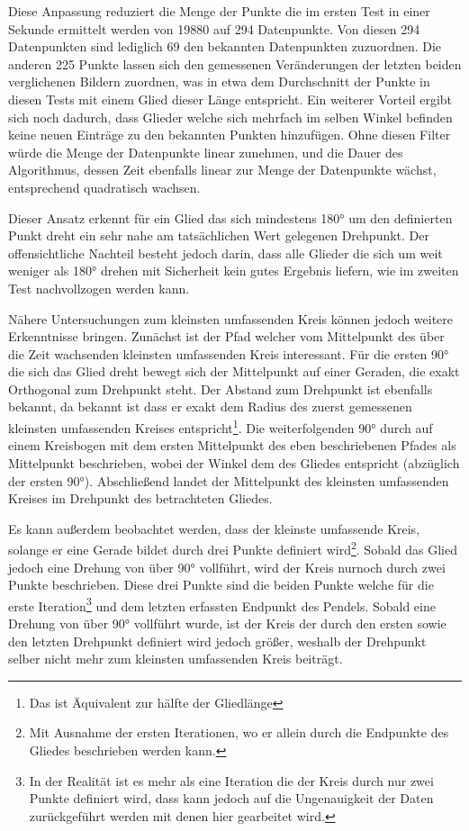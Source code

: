 Diese Anpassung reduziert die Menge der Punkte die im ersten Test in einer Sekunde ermittelt werden von 19880 auf 294 Datenpunkte.
Von diesen 294 Datenpunkten sind lediglich 69 den bekannten Datenpunkten zuzuordnen.
Die anderen 225 Punkte lassen sich den gemessenen Veränderungen der letzten beiden verglichenen Bildern zuordnen, was in etwa dem Durchschnitt der Punkte in diesen Tests mit einem Glied dieser Länge entspricht.
Ein weiterer Vorteil ergibt sich noch dadurch, dass Glieder welche sich mehrfach im selben Winkel befinden keine neuen Einträge zu den bekannten Punkten hinzufügen.
Ohne diesen Filter würde die Menge der Datenpunkte linear zunehmen, und die Dauer des Algorithmus, dessen Zeit ebenfalls linear zur Menge der Datenpunkte wächst, entsprechend quadratisch wachsen.


Dieser Ansatz erkennt für ein Glied das sich mindestens 180° um den definierten Punkt dreht ein sehr nahe am tatsächlichen Wert gelegenen Drehpunkt.
Der offensichtliche Nachteil besteht jedoch darin, dass alle Glieder die sich um weit weniger als 180° drehen mit Sicherheit kein gutes Ergebnis liefern, wie im zweiten Test nachvollzogen werden kann.

Nähere Untersuchungen zum kleinsten umfassenden Kreis können jedoch weitere Erkenntnisse bringen.
Zunächst ist der Pfad welcher vom Mittelpunkt des über die Zeit wachsenden kleinsten umfassenden Kreis interessant.
Für die ersten 90° die sich das Glied dreht bewegt sich der Mittelpunkt auf einer Geraden, die exakt Orthogonal zum Drehpunkt steht.
Der Abstand zum Drehpunkt ist ebenfalls bekannt, da bekannt ist dass er exakt dem Radius des zuerst gemessenen kleinsten umfassenden Kreises entspricht\footnote{Das ist Äquivalent zur hälfte der Gliedlänge}.
Die weiterfolgenden 90° durch auf einem Kreisbogen mit dem ersten Mittelpunkt des eben beschriebenen Pfades als Mittelpunkt beschrieben, wobei der Winkel dem des Gliedes entspricht (abzüglich der ersten 90°).
Abschließend landet der Mittelpunkt des kleinsten umfassenden Kreises im Drehpunkt des betrachteten Gliedes.

Es kann außerdem beobachtet werden, dass der kleinste umfassende Kreis, solange er eine Gerade bildet durch drei Punkte definiert wird\footnote{Mit Ausnahme der ersten Iterationen, wo er allein durch die Endpunkte des Gliedes beschrieben werden kann.}.
Sobald das Glied jedoch eine Drehung von über 90° vollführt, wird der Kreis nurnoch durch zwei Punkte beschrieben.
Diese drei Punkte sind die beiden Punkte welche für die erste Iteration\footnote{In der Realität ist es mehr als eine Iteration die der Kreis durch nur zwei Punkte definiert wird, dass kann jedoch auf die Ungenauigkeit der Daten zurückgeführt werden mit denen hier gearbeitet wird.} und dem letzten erfassten Endpunkt des Pendels.
Sobald eine Drehung von über 90° vollführt wurde, ist der Kreis der durch den ersten sowie den letzten Drehpunkt definiert wird jedoch größer, weshalb der Drehpunkt selber nicht mehr zum kleinsten umfassenden Kreis beiträgt.

